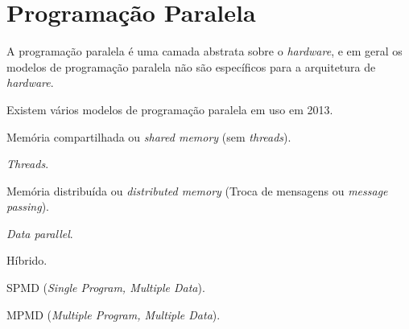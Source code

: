 
\chapter{Programação Paralela}

A programação paralela é uma camada abstrata sobre o \textit{hardware}, e em 
geral os modelos de programação paralela não são específicos para a arquitetura
de \textit{hardware}.

Existem vários modelos de programação paralela em uso em 2013.

\begin{alineas}
        \item Memória compartilhada ou \textit{shared memory} (sem
                        \textit{threads}).
        \item \textit{Threads}.
        \item Memória distribuída ou \textit{distributed memory} (Troca de
                        mensagens ou \textit{message passing}).
        \item \textit{Data parallel}.
        \item Híbrido.
        \item SPMD (\textit{Single Program, Multiple Data}).
        \item MPMD (\textit{Multiple Program, Multiple Data}).
\end{alineas}



